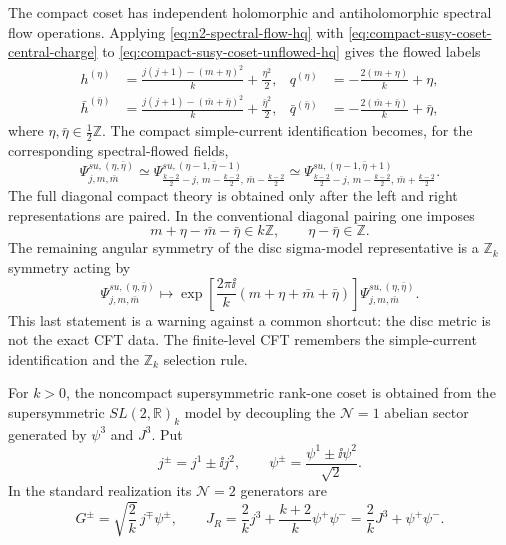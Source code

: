 The compact coset has independent holomorphic and antiholomorphic spectral
flow operations.  Applying \eqref{eq:n2-spectral-flow-hq} with
\eqref{eq:compact-susy-coset-central-charge} to
\eqref{eq:compact-susy-coset-unflowed-hq} gives the flowed labels
\begin{align}
  h^{(\eta)}
  &=
  \frac{j(j+1)-(m+\eta)^2}{k}+\frac{\eta^2}{2},
  &
  q^{(\eta)}
  &=
  -\frac{2(m+\eta)}{k}+\eta,
  \label{eq:compact-susy-coset-flowed-hq}\\
  \bar h^{(\bar\eta)}
  &=
  \frac{j(j+1)-(\bar m+\bar\eta)^2}{k}
  +\frac{\bar\eta^2}{2},
  &
  \bar q^{(\bar\eta)}
  &=
  -\frac{2(\bar m+\bar\eta)}{k}+\bar\eta,
  \nonumber
\end{align}
where \(\eta,\bar\eta\in\frac12\mathbb Z\).  The compact simple-current
identification becomes, for the corresponding spectral-flowed fields,
\begin{equation}
  \Psi^{su,(\eta,\bar\eta)}_{j,m,\bar m}
  \simeq
  \Psi^{su,(\eta-1,\bar\eta-1)}
       _{\frac{k-2}{2}-j,\,
         m-\frac{k-2}{2},\,\bar m-\frac{k-2}{2}}
  \simeq
  \Psi^{su,(\eta-1,\bar\eta+1)}
       _{\frac{k-2}{2}-j,\,
         m-\frac{k-2}{2},\,\bar m+\frac{k-2}{2}} .
  \label{eq:compact-susy-coset-field-identification}
\end{equation}
The full diagonal compact theory is obtained only after the left and right
representations are paired.  In the conventional diagonal pairing one
imposes
\begin{equation}
  m+\eta-\bar m-\bar\eta\in k\mathbb Z,
  \qquad
  \eta-\bar\eta\in\mathbb Z .
  \label{eq:compact-susy-coset-diagonal-condition}
\end{equation}
The remaining angular symmetry of the disc sigma-model representative is a
\(\mathbb Z_k\) symmetry acting by
\begin{equation}
  \Psi^{su,(\eta,\bar\eta)}_{j,m,\bar m}
  \longmapsto
  \exp\left[
    \frac{2\pi\ii}{k}(m+\eta+\bar m+\bar\eta)
  \right]
  \Psi^{su,(\eta,\bar\eta)}_{j,m,\bar m}.
  \label{eq:compact-susy-coset-zk-action}
\end{equation}
This last statement is a warning against a common shortcut: the disc metric
is not the exact CFT data.  The finite-level CFT remembers the simple-current
identification and the \(\mathbb Z_k\) selection rule.

\begin{definition}
\label{def:noncompact-supersymmetric-rank-one-coset}
For \(k>0\), the noncompact supersymmetric rank-one coset is obtained from
the supersymmetric \(SL(2,\mathbb R)_k\) model by decoupling the
\(\mathcal N=1\) abelian sector generated by \(\psi^3\) and \(J^3\).  Put
\[
  j^\pm=j^1\pm\ii j^2,
  \qquad
  \psi^\pm=\frac{\psi^1\pm\ii\psi^2}{\sqrt2}.
\]
In the standard realization its \(\mathcal N=2\) generators are
\begin{equation}
  G^\pm
  =
  \sqrt{\frac2k}\,j^\mp\psi^\pm,
  \qquad
  J_R
  =
  \frac2k j^3+\frac{k+2}{k}\psi^+\psi^-
  =
  \frac2k J^3+\psi^+\psi^- .
  \label{eq:noncompact-susy-coset-n2-generators}
\end{equation}
\end{definition}

